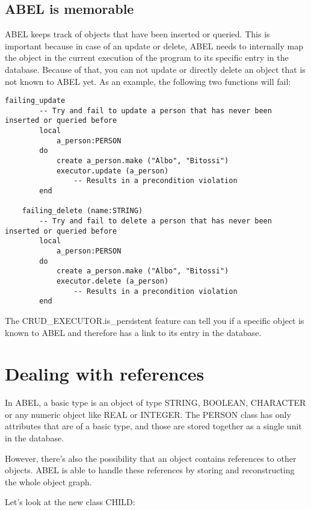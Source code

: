 \subsection{ABEL is memorable}

ABEL keeps track of objects that have been inserted or queried.
This is important because in case of an update or delete, ABEL needs to internally map the object in the current execution of the program to its specific entry in the database.
Because of that, you can not update or directly delete an object that is not known to ABEL yet.
As an example, the following two functions will fail:

\begin{lstlisting}[language=OOSC2Eiffel, captionpos=b, caption={}, label={lst:simple_insert}]
	failing_update
		-- Try and fail to update a person that has never been inserted or queried before
		local
			a_person:PERSON
		do
			create a_person.make ("Albo", "Bitossi")
			executor.update (a_person)
				-- Results in a precondition violation
		end

	failing_delete (name:STRING)
		-- Try and fail to delete a person that has never been inserted or queried before
		local
			a_person:PERSON
		do
			create a_person.make ("Albo", "Bitossi")
			executor.delete (a_person) 
				-- Results in a precondition violation
		end
\end{lstlisting}

The CRUD\_EXECUTOR.is\_persistent feature can tell you if a specific object is known to ABEL and therefore has a link to its entry in the database.





\section{Dealing with references}
\label {sec:references}

In ABEL, a basic type is an object of type STRING, BOOLEAN, CHARACTER or any numeric object like REAL or INTEGER.
The PERSON class has only attributes that are of a basic type, and those are stored together as a single unit in the database.

However, there's also the possibility that an object contains references to other objects.
ABEL is able to handle these references by storing and reconstructing the whole object graph.

Let's look at the new class CHILD:


